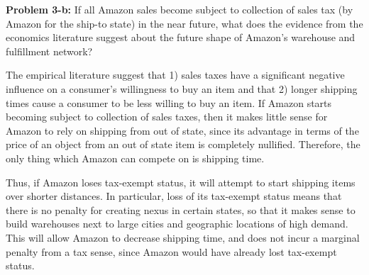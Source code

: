 \documentclass[psamsfonts]{amsart}
\newenvironment{sol}{\vspace{0.25cm}{\large \bfseries Solution:}}{\qedsymbol}
\newenvironment{prob}[1]{\begin{framed}{\large \bfseries Problem #1:}}{\end{framed}}
\begin{document}
\begin{prob}{3-b}
If all Amazon sales become subject to collection of sales tax (by Amazon for the ship-to state) in the near future, what does the evidence from the economics literature suggest about the future shape of Amazon's warehouse and fulfillment network?
\end{prob}
\begin{sol}
The empirical literature suggest that 1) sales taxes have a significant negative influence on a consumer's willingness to buy an item and that 2) longer shipping times cause a consumer to be less willing to buy an item. If Amazon starts becoming subject to collection of sales taxes, then it makes little sense for Amazon to rely on shipping from out of state, since its advantage in terms of the price of an object from an out of state item is completely nullified. Therefore, the only thing which Amazon can compete on is shipping time. 

Thus, if Amazon loses tax-exempt status, it will attempt to start shipping items over shorter distances. In particular, loss of its tax-exempt status means that there is no penalty for creating nexus in certain states, so that it makes sense to build warehouses next to large cities and geographic locations of high demand. This will allow Amazon to decrease shipping time, and does not incur a marginal penalty from a tax sense, since Amazon would have already lost tax-exempt status.
\end{sol}
\end{document}
